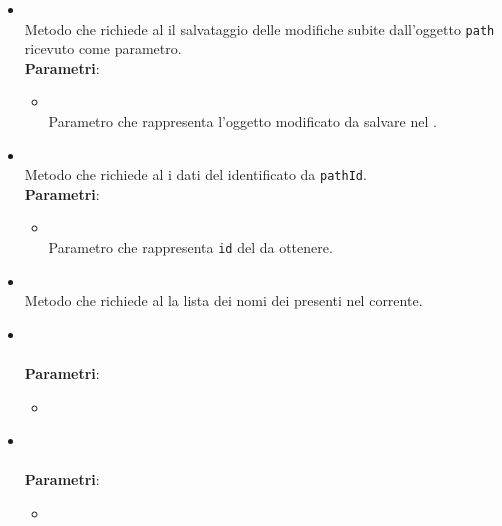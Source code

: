 \begin{itemize}
\begin{itemize}
\item {}
\\ Metodo che richiede al  il salvataggio delle modifiche subite dall'oggetto \texttt{path} ricevuto come parametro. \dpReturnPromiseNoValue
\\ \textbf{Parametri}:
\begin{itemize}
\item {}
\\ Parametro che rappresenta l'oggetto modificato da salvare nel .
\end{itemize}
\item {}
\\ Metodo che richiede al  i dati del  identificato da \texttt{pathId}.
\\ \textbf{Parametri}:
\begin{itemize}
\item {}
\\ Parametro che rappresenta \texttt{id} del  da ottenere.
\end{itemize}
\item {}
\\ Metodo che richiede al  la lista dei nomi dei  presenti nel  corrente.
\item {}
\\ \dpHandleError
\\ \textbf{Parametri}:
\begin{itemize}
\item {}
\\ \dpResponseParam
\end{itemize}
\item {}
\\ \dpHandleSuccess
\\ \textbf{Parametri}:
\begin{itemize}
\item {}

\end{itemize}
\end{itemize}
\end{itemize}
